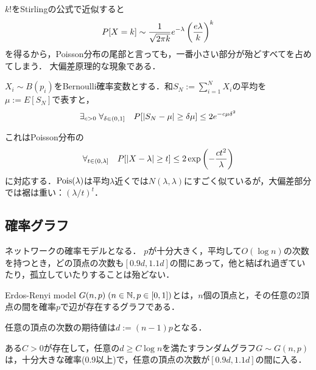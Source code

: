 \documentclass[uplatex,dvipdfmx]{jsreport}
\begin{document}
\begin{remark}[Poisson尾部の観察]
    $k!$をStirlingの公式で近似すると
    \[P[X=k]\sim\frac{1}{\sqrt{2\pi k}}e^{-\lambda}\left(\frac{e\lambda}{k}\right)^k\]
    を得るから，Poisson分布の尾部と言っても，一番小さい部分が殆どすべてを占めてしまう．
    大偏差原理的な現象である．
\end{remark}

\begin{theorem}[小偏差の場合]
    $X_i\sim B(p_i)$をBernoulli確率変数とする．和$S_N:=\sum_{i=1}^NX_i$の平均を$\mu:=E[S_N]$で表すと，
    \[\exists_{c>0}\;\forall_{\delta\in(0,1]}\quad P[\lvert S_N-\mu\rvert\ge\delta\mu]\le 2e^{-c\mu\delta^2}\]
\end{theorem}
\begin{remarks}
    これはPoisson分布の
    \[\forall_{t\in(0,\lambda]}\quad P[\lvert X-\lambda\rvert\ge t]\le 2\exp\left(-\frac{ct^2}{\lambda}\right)\]
    に対応する．$\mathrm{Pois}(\lambda)$は平均$\lambda$近くでは$N(\lambda,\lambda)$にすごく似ているが，大偏差部分では裾は重い：$(\lambda/t)^t$．
\end{remarks}

\subsection{確率グラフ}

\begin{tcolorbox}[colframe=ForestGreen, colback=ForestGreen!10!white,breakable,colbacktitle=ForestGreen!40!white,coltitle=black,fonttitle=\bfseries\sffamily,
title=]
    ネットワークの確率モデルとなる．
    $p$が十分大きく，平均して$O(\log n)$の次数を持つとき，どの頂点の次数も$[0.9d,1.1d]$の間にあって，他と結ばれ過ぎていたり，孤立していたりすることは殆どない．
\end{tcolorbox}

\begin{definition}
    Erdos-Renyi model $G(n,p)\;(n\in\mathbb{N},p\in[0,1])$とは，$n$個の頂点と，その任意の2頂点の間を確率$p$で辺が存在するグラフである．
\end{definition}

\begin{lemma}
    任意の頂点の次数の期待値は$d:=(n-1)p$となる．
\end{lemma}

\begin{theorem}
    ある$C>0$が存在して，任意の$d\ge C\log n$を満たすランダムグラフ$G\sim G(n,p)$は，十分大きな確率(0.9以上)で，任意の頂点の次数が$[0.9d,1.1d]$の間に入る．
\end{theorem}
\end{document}
